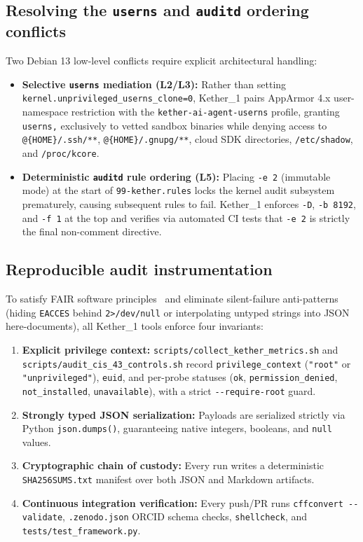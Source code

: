 \documentclass[11pt,a4paper]{article}
\newcommand{\code}[1]{\nolinkurl{#1}}
\begin{document}
\subsection{Resolving the \texttt{userns} and \texttt{auditd} ordering conflicts}

Two Debian 13 low-level conflicts require explicit architectural handling:
\begin{itemize}[leftmargin=1.5em, itemsep=2pt]
  \item \textbf{Selective \texttt{userns} mediation (L2/L3):} Rather than setting \code{kernel.unprivileged_userns_clone=0}, Kether\_1 pairs AppArmor 4.x user-namespace restriction with the \code{kether-ai-agent-userns} profile, granting \texttt{userns,} exclusively to vetted sandbox binaries while denying access to \code{@{HOME}/.ssh/**}, \code{@{HOME}/.gnupg/**}, cloud SDK directories, \code{/etc/shadow}, and \code{/proc/kcore}.
  \item \textbf{Deterministic \texttt{auditd} rule ordering (L5):} Placing \code{-e 2} (immutable mode) at the start of \code{99-kether.rules} locks the kernel audit subsystem prematurely, causing subsequent rules to fail. Kether\_1 enforces \code{-D}, \code{-b 8192}, and \code{-f 1} at the top and verifies via automated CI tests that \code{-e 2} is strictly the final non-comment directive.
\end{itemize}

\subsection{Reproducible audit instrumentation}

To satisfy FAIR software principles~\cite{wilkinson2016fair} and eliminate silent-failure anti-patterns (hiding \code{EACCES} behind \code{2>/dev/null} or interpolating untyped strings into JSON here-documents), all Kether\_1 tools enforce four invariants:
\begin{enumerate}[leftmargin=1.5em, itemsep=2pt]
  \item \textbf{Explicit privilege context:} \code{scripts/collect_kether_metrics.sh} and \code{scripts/audit_cis_43_controls.sh} record \code{privilege_context} (\code{"root"} or \code{"unprivileged"}), \code{euid}, and per-probe statuses (\code{ok}, \code{permission_denied}, \code{not_installed}, \code{unavailable}), with a strict \code{--require-root} guard.
  \item \textbf{Strongly typed JSON serialization:} Payloads are serialized strictly via Python \code{json.dumps()}, guaranteeing native integers, booleans, and \code{null} values.
  \item \textbf{Cryptographic chain of custody:} Every run writes a deterministic \code{SHA256SUMS.txt} manifest over both JSON and Markdown artifacts.
  \item \textbf{Continuous integration verification:} Every push/PR runs \code{cffconvert --validate}, \code{.zenodo.json} ORCID schema checks, \code{shellcheck}, and \code{tests/test_framework.py}.
\end{enumerate}
\end{document}

